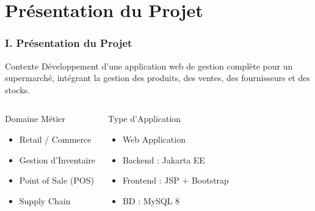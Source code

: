 \documentclass[11pt, aspectratio=169]{beamer}
\begin{document}
\section{Présentation du Projet}

\begin{frame}
    \frametitle{I. Présentation du Projet}
    
    \begin{block}{Contexte}
        Développement d'une application web de gestion complète pour un supermarché,
        intégrant la gestion des produits, des ventes, des fournisseurs et des stocks.
    \end{block}
    
    \vspace{1cm}
    
    \begin{columns}[T]
        \begin{block}{Domaine Métier}
            \begin{itemize}
                \item[\faCheckCircle] Retail / Commerce
                \item[\faCheckCircle] Gestion d'Inventaire
                \item[\faCheckCircle] Point of Sale (POS)
                \item[\faCheckCircle] Supply Chain
            \end{itemize}
        \end{block}
        
        \begin{block}{Type d'Application}
            \begin{itemize}
                \item[\faServer] Web Application
                \item[\faCode] Backend : Jakarta EE
                \item[\faDisplay] Frontend : JSP + Bootstrap
                \item[\faDatabase] BD : MySQL 8
            \end{itemize}
        \end{block}
    \end{columns}
\end{frame}

\end{document}
